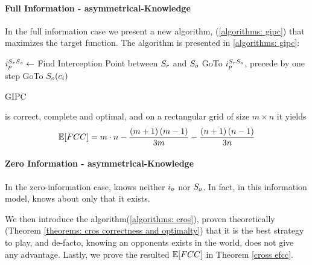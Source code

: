 \documentclass[a4paper,english,10pt]{article}
\begin{document}
\paragraph{Full Information - asymmetrical-Knowledge}

In the full information case we present a new algorithm, \gipc (\ref{algorithms: gipc}) that maximizes the \fcc target function.
The algorithm is presented in \ref{algorithms: gipc}:
\begin{algorithm}
\begin{algorithmic}
	\STATE $i_p^{S_r S_o} \leftarrow $ Find Interception Point between $S_r$ and $S_o$
    \STATE GoTo $i_p^{S_r S_o}$, precede \opp by one step
    \LOOP
        	\STATE GoTo $S_o(c_i)$
        \ENDIF
    \ENDLOOP
  
\end{algorithmic}
\caption{GIPC\label{algorithms: gipc}}
\end{algorithm}

\begin{theorem}
\gipc is correct, complete and optimal, and on a rectangular grid of size $m\times n$ it yields \[\mathbb{E}[FCC] = m\cdot n-\frac{\left(m+1\right)\left(m-1\right)}{3m}-\frac{\left(n+1\right)\left(n-1\right)}{3n}\]
\end{theorem}


\paragraph{Zero Information - asymmetrical-Knowledge}
In the zero-information case, \rob knows neither $i_o$ nor $S_o$. In fact, in this information model, \rob knows about \opp only that it exists.

We then introduce the \cros algorithm(\ref{algorithms: cros}), proven theoretically (Theorem \ref{theorems: cros correctness and optimalty}) that it is the best strategy to play, and de-facto, knowing an opponents exists in the world, does not give \rob any advantage. Lastly, we prove the resulted $\mathbb{E}[FCC]$ in Theorem \ref{cross efcc}.
\end{document}
